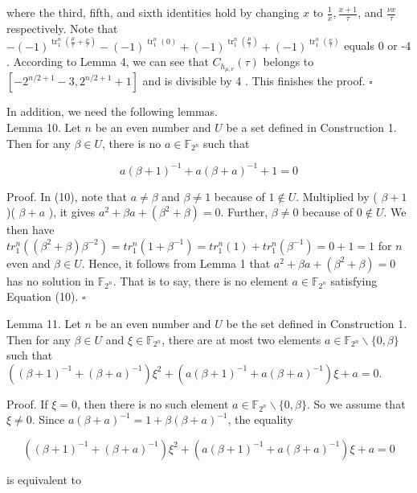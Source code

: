\documentclass[10pt]{article}
\begin{document}
where the third, fifth, and sixth identities hold by changing $x$ to $\frac{1}{x}, \frac{x+1}{\tau}$, and $\frac{\nu x}{\tau}$ respectively. Note that $-(-1)^{\operatorname{tr}_{1}^{n}\left(\frac{\mu}{\tau}+\frac{\nu}{\tau}\right)}-(-1)^{\operatorname{tr}_{1}^{n}(0)}+(-1)^{\operatorname{tr}_{1}^{n}\left(\frac{\mu}{\tau}\right)}+(-1)^{\operatorname{tr}_{1}^{n}\left(\frac{\nu}{\tau}\right)}$ equals 0 or -4 . According to Lemma 4, we can see that $C_{h_{\mu, \nu}}(\tau)$ belongs to $\left[-2^{n / 2+1}-3,2^{n / 2+1}+1\right]$ and is divisible by 4 . This finishes the proof. \(\square\)

In addition, we need the following lemmas.\\
Lemma 10. Let $n$ be an even number and $U$ be a set defined in Construction 1. Then for any $\beta \in U$, there is no $a \in \mathbb{F}_{2^{n}}$ such that


\begin{equation*}
a(\beta+1)^{-1}+a(\beta+a)^{-1}+1=0 \tag{10}
\end{equation*}


Proof. In (10), note that $a \neq \beta$ and $\beta \neq 1$ because of $1 \notin U$. Multiplied by ( $\beta+1$ )( $\beta+a$ ), it gives $a^{2}+\beta a+\left(\beta^{2}+\beta\right)=0$. Further, $\beta \neq 0$ because of $0 \notin U$. We then have $t r_{1}^{n}\left(\left(\beta^{2}+\beta\right) \beta^{-2}\right)=t r_{1}^{n}\left(1+\beta^{-1}\right)=t r_{1}^{n}(1)+t r_{1}^{n}\left(\beta^{-1}\right)=0+1=1$ for $n$ even and $\beta \in U$. Hence, it follows from Lemma 1 that $a^{2}+\beta a+\left(\beta^{2}+\beta\right)=0$ has no solution in $\mathbb{F}_{2^{n}}$. That is to say, there is no element $a \in \mathbb{F}_{2^{n}}$ satisfying Equation (10). \(\square\)

Lemma 11. Let $n$ be an even number and $U$ be the set defined in Construction 1. Then for any $\beta \in U$ and $\xi \in \mathbb{F}_{2^{n}}$, there are at most two elements $a \in \mathbb{F}_{2^{n}} \backslash\{0, \beta\}$ such that $\left((\beta+1)^{-1}+(\beta+a)^{-1}\right) \xi^{2}+\left(a(\beta+1)^{-1}+a(\beta+a)^{-1}\right) \xi+a=0$.

Proof. If $\xi=0$, then there is no such element $a \in \mathbb{F}_{2^{n}} \backslash\{0, \beta\}$. So we assume that $\xi \neq 0$. Since $a(\beta+a)^{-1}=1+\beta(\beta+a)^{-1}$, the equality

$$
\left((\beta+1)^{-1}+(\beta+a)^{-1}\right) \xi^{2}+\left(a(\beta+1)^{-1}+a(\beta+a)^{-1}\right) \xi+a=0
$$

is equivalent to
\end{document}
